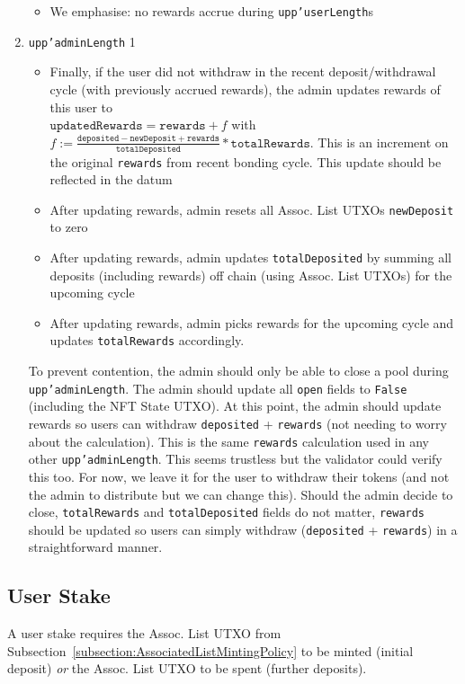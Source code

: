 \documentclass[10pt, a4paper]{article}
\theoremstyle{definition}
\begin{document}
\begin{enumerate}
{\begin{itemize}
{$f$ is a user factor defined as $f := \frac{\texttt{deposited} - \texttt{newDeposit} + \texttt{rewards}}{\texttt{totalDeposited}} * \texttt{totalRewards}$
}
\item{We emphasise: no rewards accrue during \texttt{upp'userLength}s}
\end{itemize}
}


\item{\texttt{upp'adminLength} 1
\begin{itemize}
\item{Finally, if the user did not withdraw in the recent deposit/withdrawal cycle (with previously accrued rewards), the admin updates rewards of this user to \\ $\texttt{updatedRewards} = \texttt{rewards} + f $ with $f := \frac{\texttt{deposited} - \texttt{newDeposit} + \texttt{rewards}}{\texttt{totalDeposited}} * \texttt{totalRewards}$. This is an increment on the original \texttt{rewards} from recent bonding cycle. This update should be reflected in the datum}
\item{After updating rewards, admin resets all Assoc. List UTXOs \texttt{newDeposit} to zero}
\item{After updating rewards, admin updates \texttt{totalDeposited} by summing all deposits (including rewards) off chain (using Assoc. List UTXOs) for the upcoming cycle}
\item{After updating rewards, admin picks rewards for the upcoming cycle and updates \texttt{totalRewards} accordingly.}
\end{itemize}
}
To prevent contention, the admin should only be able to close a pool during \texttt{upp'adminLength}. The admin should update all \texttt{open} fields to \texttt{False} (including the NFT State UTXO). At this point, the admin should update rewards so users can withdraw \texttt{deposited} + \texttt{rewards} (not needing to worry about the calculation). This is the same \texttt{rewards} calculation used in any other \texttt{upp'adminLength}. This seems trustless but the validator could verify this too. For now, we leave it for the user to withdraw their tokens (and not the admin to distribute but we can change this). Should the admin decide to close, \texttt{totalRewards} and \texttt{totalDeposited} fields do not matter, \texttt{rewards} should be updated so users can simply withdraw (\texttt{deposited} + \texttt{rewards}) in a straightforward manner.
\end{enumerate}

\label{section:unbondedSchema}
\subsection{User Stake}\label{subsection:userStake}
A user stake requires the Assoc. List UTXO from Subsection~\ref{subsection:AssociatedListMintingPolicy} to be minted (initial deposit) \textit{or} the Assoc. List UTXO to be spent (further deposits).
\end{document}
